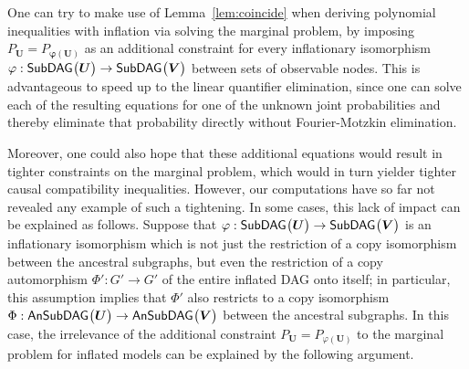 

One can try to make use of Lemma~\ref{lem:coincide} when deriving polynomial inequalities with inflation via solving the marginal problem, by imposing $P_{\bm{U}} = P_{\bm{\varphi(\bm{U})}}$ as an additional constraint for every inflationary isomorphism $\varphi : {\operatorname{\mathsf{SubDAG}}_{}}\bigl\lparen\bm{U}\bigr\rparen\to{\operatorname{\mathsf{SubDAG}}_{}}\bigl\lparen\bm{V}\bigr\rparen$ between sets of observable nodes. This is advantageous to speed up to the linear quantifier elimination, since one can solve each of the resulting equations for one of the unknown joint probabilities and thereby eliminate that probability directly without Fourier-Motzkin elimination.

Moreover, one could also hope that these additional equations would result in tighter constraints on the marginal problem, which would in turn yielder tighter causal compatibility inequalities. However, our computations have so far not revealed any example of such a tightening. In some cases, this lack of impact can be explained as follows.
Suppose that $\varphi:{\operatorname{\mathsf{SubDAG}}_{}}\bigl\lparen\bm{U}\bigr\rparen\to{\operatorname{\mathsf{SubDAG}}_{}}\bigl\lparen\bm{V}\bigr\rparen$ is an inflationary isomorphism 
which is not just the restriction of a copy isomorphism between the ancestral subgraphs, but even the restriction of a copy automorphism 
$\Phi':G'\to G'$ of the entire inflated DAG onto itself; in particular, this assumption implies that $\Phi'$ also restricts to a copy isomorphism $\Phi:{\operatorname{\mathsf{AnSubDAG}}_{}}\bigl\lparen\bm{U}\bigr\rparen\to{\operatorname{\mathsf{AnSubDAG}}_{}}\bigl\lparen\bm{V}\bigr\rparen$ between the ancestral subgraphs. In this case, the irrelevance of the additional constraint $P_{\bm{U}} = P_{\varphi(\bm{U})}$ to the marginal problem for inflated models can be explained by the following argument. 

